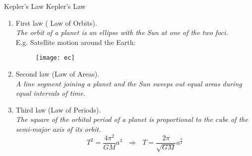\documentclass[10pt]{beamer}
\begin{document}
\begin{frame}[allowframebreaks]{Kepler's Law}
	Kepler's Law
	\begin{enumerate}
		\item First law ({\color{blue} Law of Orbits}).
		$$$${\it \large The orbit of a planet is an ellipse with the Sun at one of the two foci.}
		$$$$E.g. Satellite motion around the Earth:
		\begin{figure}[H]
			\centering
			\texttt{[image: ec]}
		\end{figure}
		\item Second law ({\color{blue}Law of Areas}). 
		$$$${\it \large A line segment joining a planet and the Sun sweeps out equal areas
		during equal intervals of time.}
	
	\begin{center}
		
	\end{center}
	
	
		\item Third law ({\color{blue}Law of Periods}).
		$$$${\it \large The square of the orbital period of a planet is proportional to the
		cube of the semi-major axis of its orbit.}
		$$T^2 = \dfrac{4\pi^2}{GM}a^3~~~\Rightarrow ~~~T = \dfrac{2\pi}{\sqrt{GM}}a^{\frac{3}{2}}$$
	\end{enumerate}
	
\end{frame}
\end{document}
